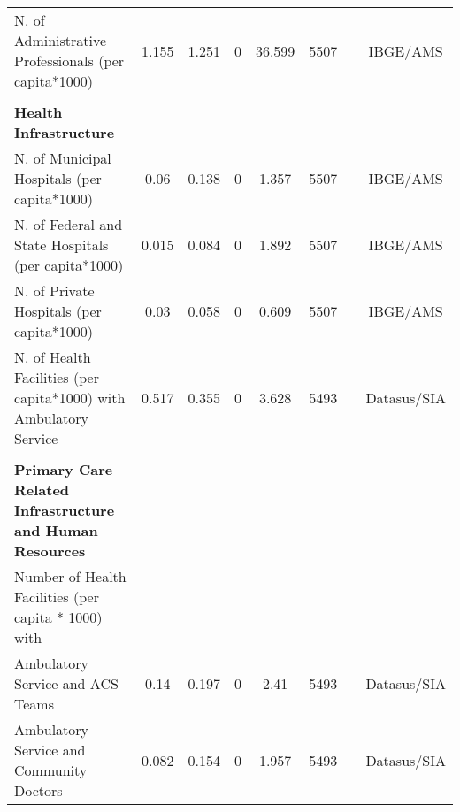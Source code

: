 \begin{table}[H]
\begin{footnotesize}
\begin{center}
{\begin{threeparttable}[b]
\begin{tabular}{rrrrrrrr}
    \multicolumn{1}{l}{N. of Administrative Professionals (per capita*1000)} & \multicolumn{1}{c}{1.155} & \multicolumn{1}{c}{1.251} & \multicolumn{1}{c}{0} & \multicolumn{1}{c}{36.599} & \multicolumn{1}{c}{5507} &       & \multicolumn{1}{c}{IBGE/AMS} \\
          &       &       &       &       &       &       &  \\
    \multicolumn{1}{l}{\textbf{Health Infrastructure}} &       &       &       &       &       &       &  \\
    \multicolumn{1}{l}{N. of Municipal Hospitals (per capita*1000)} & \multicolumn{1}{c}{0.06} & \multicolumn{1}{c}{0.138} & \multicolumn{1}{c}{0} & \multicolumn{1}{c}{1.357} & \multicolumn{1}{c}{5507} &       & \multicolumn{1}{c}{IBGE/AMS} \\
    \multicolumn{1}{l}{N. of Federal and State Hospitals (per capita*1000)} & \multicolumn{1}{c}{0.015} & \multicolumn{1}{c}{0.084} & \multicolumn{1}{c}{0} & \multicolumn{1}{c}{1.892} & \multicolumn{1}{c}{5507} &       & \multicolumn{1}{c}{IBGE/AMS} \\
    \multicolumn{1}{l}{N. of Private Hospitals (per capita*1000)} & \multicolumn{1}{c}{0.03} & \multicolumn{1}{c}{0.058} & \multicolumn{1}{c}{0} & \multicolumn{1}{c}{0.609} & \multicolumn{1}{c}{5507} &       & \multicolumn{1}{c}{IBGE/AMS} \\
    \multicolumn{1}{l}{N. of Health Facilities (per capita*1000) with Ambulatory Service} & \multicolumn{1}{c}{0.517} & \multicolumn{1}{c}{0.355} & \multicolumn{1}{c}{0} & \multicolumn{1}{c}{3.628} & \multicolumn{1}{c}{5493} &       & \multicolumn{1}{c}{Datasus/SIA} \\
          &       &       &       &       &       &       &  \\
    \multicolumn{1}{l}{\textbf{Primary Care Related Infrastructure and Human Resources}} &       &       &       &       &       &       &  \\
    \multicolumn{1}{l}{Number of Health Facilities (per capita * 1000) with} &       &       &       &       &       &       &  \\
    \multicolumn{1}{l}{Ambulatory Service and ACS Teams} & \multicolumn{1}{c}{0.14} & \multicolumn{1}{c}{0.197} & \multicolumn{1}{c}{0} & \multicolumn{1}{c}{2.41} & \multicolumn{1}{c}{5493} &       & \multicolumn{1}{c}{Datasus/SIA} \\
    \multicolumn{1}{l}{Ambulatory Service and Community Doctors} & \multicolumn{1}{c}{0.082} & \multicolumn{1}{c}{0.154} & \multicolumn{1}{c}{0} & \multicolumn{1}{c}{1.957} & \multicolumn{1}{c}{5493} &       & \multicolumn{1}{c}{Datasus/SIA} \\

\end{tabular}
\end{threeparttable}}
\end{center}
\end{footnotesize}
\end{table}
